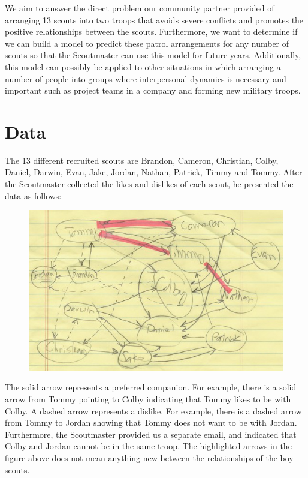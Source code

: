 \documentclass{amsart}
\theoremstyle{definition}
\theoremstyle{remark}
\numberwithin{equation}{section}
\begin{document}
We aim to answer the direct problem our community partner provided of arranging 13 scouts into two troops that avoids severe conflicts and promotes the positive relationships between the scouts. Furthermore, we want to determine if we can build a model to predict these patrol arrangements for any number of scouts so that the Scoutmaster can use this model for future years. Additionally, this model can possibly be applied to other situations in which arranging a number of people into groups where interpersonal dynamics is necessary and important such as project teams in a company and forming new military troops.

\section*{Data}
The 13 different recruited scouts are Brandon, Cameron, Christian, Colby, Daniel, Darwin, Evan, Jake, Jordan, Nathan, Patrick, Timmy and Tommy. After the Scoutmaster collected the likes and dislikes of each scout, he presented the data as follows: 
\begin{figure}[h]
	\centering
	\includegraphics[scale=0.60]{graph}
\end{figure}

The solid arrow represents a preferred companion. For example, there is a solid arrow from Tommy pointing to Colby indicating that Tommy likes to be with Colby. A dashed arrow represents a dislike. For example, there is a dashed arrow from Tommy to Jordan showing that Tommy does not want to be with Jordan. Furthermore, the Scoutmaster provided us a separate email, and indicated that Colby and Jordan cannot be in the same troop. The highlighted arrows in the figure above does not mean anything new between the relationships of the boy scouts.
\end{document}

